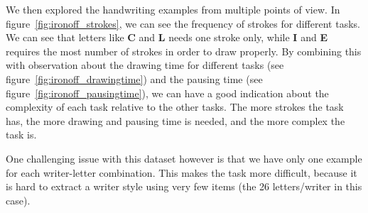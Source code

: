 \par We then explored the handwriting examples from multiple points of view. In figure~\ref{fig:ironoff_strokes}, we can see the frequency of strokes for different tasks. We can see that letters like \textbf{C} and \textbf{L} needs one stroke only, while \textbf{I} and \textbf{E} requires the most number of strokes in order to draw properly. By combining this with observation about the drawing time for different tasks (see figure~\ref{fig:ironoff_drawingtime}) and the pausing time (see figure~\ref{fig:ironoff_pausingtime}), we can have a good indication about the complexity of each task relative to the other tasks. The more strokes the task has, the more drawing and pausing time is needed, and the more complex the task is.

\par One challenging issue with this dataset however is that we have only one example for each writer-letter combination. This makes the task more difficult, because it is hard to extract a writer style using very few items (the 26 letters/writer in this case).

